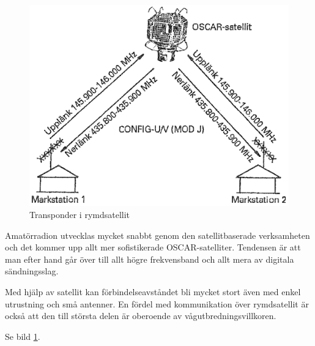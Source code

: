 
\begin{figure}
  \includegraphics[width=\textwidth]{images/cropped_pdfs/bild_2_7-13.pdf}
  \caption{Transponder i rymdsatellit}
  \label{fig:bildII7-13}
\end{figure}

Amatörradion utvecklas mycket snabbt genom den satellitbaserade
verksamheten och det kommer upp allt mer sofistikerade
OSCAR-satelliter. Tendensen är att man efter hand går över till allt
högre frekvensband och allt mera av digitala sändningsslag.

Med hjälp av satellit kan förbindelseavståndet bli mycket stort även
med enkel utrustning och små antenner. En fördel med kommunikation
över rymdsatellit är också att den till största delen är oberoende av
vågutbredningsvillkoren.

Se bild \ref{fig:bildII7-13}.
